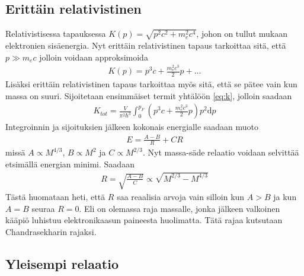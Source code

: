 \documentclass[12pt,a4paper,titlepage]{article}
\begin{document}
\subsection{Erittäin relativistinen}
Relativistisessa tapauksessa $K(p) = \sqrt{p^2 c^2 + m_e^2 c^4}$, johon on tullut mukaan elektronien sisäenergia. Nyt erittäin relativistinen tapaus tarkoittaa sitä, että $p \gg m_ec$ jolloin voidaan approksimoida
\begin{align}
K(p) = p^3 c + \frac{m_e^2 c^3}{2} p + ...
\end{align} 
Lisäksi erittäin relativistinen tapaus tarkoittaa myös sitä, että se pätee vain kun massa on suuri. Sijoitetaan ensimmäiset termit yhtälöön \eqref{eq:k}, jolloin saadaan
\begin{align}
K_{tot} = \frac{V}{\pi^2 \hbar^3} \int_0^{p_F} \left( p^3 c + \frac{m_e^2 c^3}{2} p \right) p^2 \mathrm{d}p
\end{align}
Integroinnin ja sijoituksien jälkeen kokonais energialle saadaan muoto
\begin{align}
E = \frac{A-B}{R}+C R 
\end{align}
missä $A \propto M^{4/3}$, $B \propto M^{2}$ ja $C \propto M^{2/3}$. Nyt massa-säde relaatio voidaan selvittää etsimällä energian minimi. Saadaan
\begin{align}
R = \sqrt{\frac{A-B}{C}} \propto \sqrt{M^{2/3}-M^{4/3}} \label{eq:rela}
\end{align}
Tästä huomataan heti, että $R$ saa reaalisia arvoja vain silloin kun $A > B$ ja kun $A = B$ seuraa $R = 0$. Eli on olemassa raja massalle, jonka jälkeen valkoinen kääpiö luhistuu elektronikaasun paineesta huolimatta. Tätä rajaa kutsutaan Chandrasekharin rajaksi. 

\subsection{Yleisempi relaatio}
\end{document}
